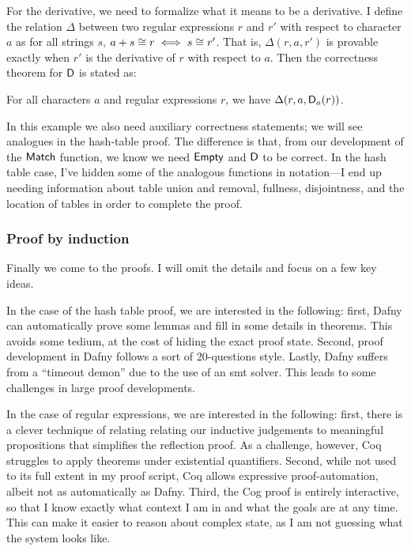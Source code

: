 For the derivative, we need to formalize what it means to be a derivative. I
define the relation \(\Delta\) between two regular expressions \(r\) and \(r'\)
with respect to character \(a\) as for all strings \(s\), \(a+s \mathrel{\cong} r \iff
s \mathrel{\cong} r'\). That is, \(\Delta(r, a, r')\) is provable exactly when \(r'\)
is the derivative of \(r\) with respect to \(a\). Then the correctness theorem
for \(\mathsf{D}\) is stated as:
\begin{lem}\label{Lem:r_derive}
    For all characters \(a\) and regular expressions \(r\), we have
    \(\Delta(r, a, \mathsf{D}_a(r))\).
\end{lem}

In this example we also need auxiliary correctness statements; we will see
analogues in the hash-table proof. The difference is that, from our development
of the \(\mathsf{Match}\) function, we know we need \(\mathsf{Empty}\) and
\(\mathsf{D}\) to be correct. In the hash table case, I've hidden some of the
analogous functions in notation---I end up needing information about table union
and removal, fullness, disjointness, and the location of tables in order to
complete the proof.

\subsubsection{Proof by induction}\label{S:ex_ind}

Finally we come to the proofs. I will omit the details and focus on a few key
ideas.

In the case of the hash table proof, we are interested in the following: first,
Dafny can automatically prove some lemmas and fill in some details in theorems.
This avoids some tedium, at the cost of hiding the exact proof state. Second,
proof development in Dafny follows a sort of 20-questions style. Lastly, Dafny
suffers from a ``timeout demon'' due to the use of an \gls{smt} solver. This
leads to some challenges in large proof developments.

In the case of regular expressions, we are interested in the following: first,
there is a clever technique of relating relating our inductive judgements to
meaningful propositions that simplifies the reflection proof. As a challenge,
however, Coq struggles to apply theorems under existential quantifiers. Second,
while not used to its full extent in my proof script, Coq allows expressive
proof-automation, albeit not as automatically as Dafny. Third, the Cog proof is
entirely interactive, so that I know exactly what context I am in and what the
goals are at any time. This can make it easier to reason about complex state, as
I am not guessing what the system looks like.

